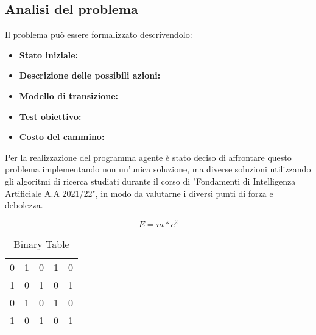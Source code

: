 \subsection{Analisi del problema}
Il problema può essere formalizzato descrivendolo: 
\begin{itemize}
\item \textbf{Stato iniziale:} 
\item \textbf{Descrizione delle possibili azioni:} 
\item \textbf{Modello di transizione:}
\item \textbf{Test obiettivo:} 
\item \textbf{Costo del cammino:} 
\end{itemize}

Per la realizzazione del programma agente è stato deciso di affrontare questo problema implementando non un'unica soluzione, ma diverse soluzioni utilizzando gli algoritmi di ricerca studiati durante il corso di "Fondamenti di Intelligenza Artificiale A.A 2021/22", in modo da valutarne i diversi punti di forza e debolezza. 


\begin{equation} \label{eqRelativity} E=m*c^2 \end{equation}




\begin{table}[h!]
\begin{center}
\caption{Binary Table}
\begin{tabular}{|l|l|l|l|l|}
\hline
0 & 1 & 0 & 1 & 0 \\ 
1 & 0 & 1 & 0 & 1 \\
0 & 1 & 0 & 1 & 0 \\
1 & 0 & 1 & 0 & 1 \\
\hline
\end{tabular}
\end{center}
\end{table}
